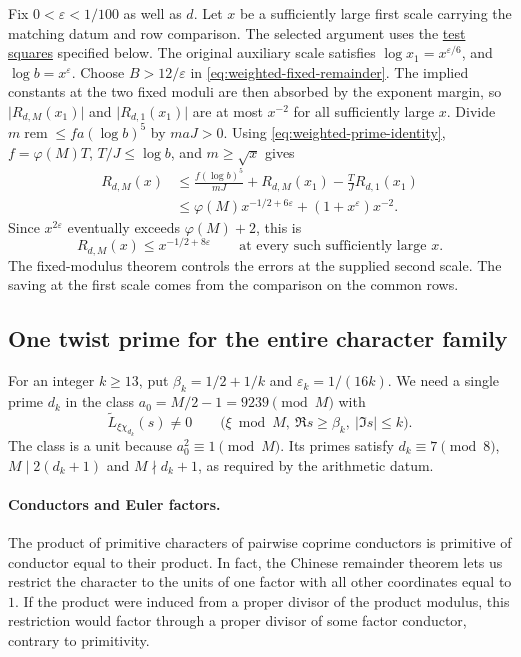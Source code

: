 Fix \(0<\varepsilon<1/100\) as well as \(d\). Let \(x\) be a sufficiently
large first scale carrying the matching datum and row comparison.
The selected argument uses the \hyperlink{proof.weighted-square-selection}{test squares}
specified below. The original auxiliary scale satisfies
\(\log x_1=x^{\varepsilon/6}\), and \(\log b=x^\varepsilon\).
Choose \(B>12/\varepsilon\) in \eqref{eq:weighted-fixed-remainder}.
The implied constants at the two fixed moduli are then absorbed by the
exponent margin, so \(\lvert R_{d,M}(x_1)\rvert\) and
\(\lvert R_{d,1}(x_1)\rvert\) are at most \(x^{-2}\) for all sufficiently
large \(x\). Divide \(m\operatorname{rem}\le fa(\log b)^5\) by \(maJ>0\).
Using \eqref{eq:weighted-prime-identity}, \(f=\varphi(M)T\),
\(T/J\le\log b\), and \(m\ge\sqrt x\) gives
\begin{align*}
 R_{d,M}(x)
 &\le \frac{f(\log b)^5}{mJ}
       +R_{d,M}(x_1)-\frac{T}{J}R_{d,1}(x_1)\\
 &\le \varphi(M)x^{-1/2+6\varepsilon}+(1+x^\varepsilon)x^{-2}.
\end{align*}
Since \(x^{2\varepsilon}\) eventually exceeds \(\varphi(M)+2\), this is
\begin{equation}\label{eq:weighted-square-bound}
 R_{d,M}(x)\le x^{-1/2+8\varepsilon}
 \qquad\text{at every such sufficiently large }x.
\end{equation}
The fixed-modulus theorem controls the errors at the supplied second scale.
The saving at the first scale comes from the comparison on the common rows.

\subsection*{One twist prime for the entire character family}

%
For an integer \(k\ge13\), put \(\beta_k=1/2+1/k\) and
\(\varepsilon_k=1/(16k)\). We need a single prime \(d_k\) in the class
\(a_0=M/2-1=9239\pmod M\) with
\begin{equation}\label{eq:weighted-twist-free}
 \widetilde L_{\xi\chi_{d_k}}(s)\ne0
 \qquad\bigl(\xi\bmod M,\ \Re s\ge\beta_k,\ |\Im s|\le k\bigr).
\end{equation}
The class is a unit because \(a_0^2\equiv1\pmod M\). Its primes satisfy
\(d_k\equiv7\pmod8\), \(M\mid2(d_k+1)\) and \(M\nmid d_k+1\), as
required by the arithmetic datum.

\paragraph{Conductors and Euler factors.}
%
The product of primitive characters of pairwise coprime conductors
is primitive of conductor equal to their product. In fact, the
Chinese remainder theorem lets us restrict the character to the
units of one factor with all other coordinates equal to \(1\).
If the product were induced from a proper divisor of the product
modulus, this restriction would factor through a proper divisor
of some factor conductor, contrary to primitivity.

